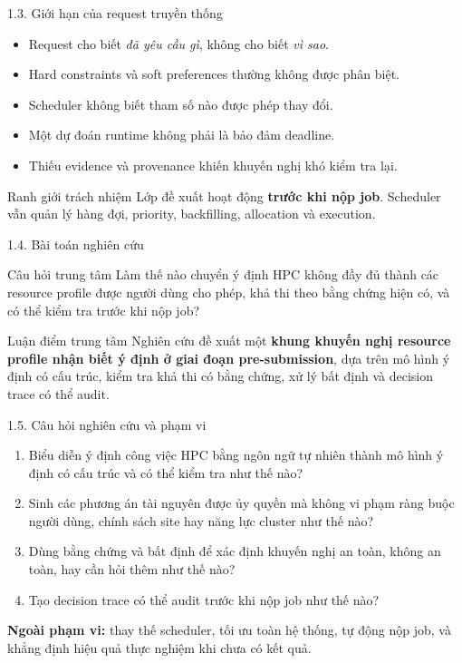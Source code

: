 \begin{frame}[t]{1.3. Giới hạn của request truyền thống}
\small
\begin{itemize}
  \item Request cho biết \emph{đã yêu cầu gì}, không cho biết \emph{vì sao}.
  \item Hard constraints và soft preferences thường không được phân biệt.
  \item Scheduler không biết tham số nào được phép thay đổi.
  \item Một dự đoán runtime không phải là bảo đảm deadline.
  \item Thiếu evidence và provenance khiến khuyến nghị khó kiểm tra lại.
\end{itemize}
\begin{exampleblock}{Ranh giới trách nhiệm}
Lớp đề xuất hoạt động \textbf{trước khi nộp job}. Scheduler vẫn quản lý hàng đợi, priority, backfilling, allocation và execution.
\end{exampleblock}
\end{frame}

\begin{frame}[t]{1.4. Bài toán nghiên cứu}
\small
\begin{block}{Câu hỏi trung tâm}
Làm thế nào chuyển ý định HPC không đầy đủ thành các resource profile được người dùng cho phép, khả thi theo bằng chứng hiện có, và có thể kiểm tra trước khi nộp job?
\end{block}
\begin{block}{Luận điểm trung tâm}
Nghiên cứu đề xuất một \textbf{khung khuyến nghị resource profile nhận biết ý định ở giai đoạn pre-submission}, dựa trên mô hình ý định có cấu trúc, kiểm tra khả thi có bằng chứng, xử lý bất định và decision trace có thể audit.
\end{block}
\end{frame}

\begin{frame}[t,shrink=8]{1.5. Câu hỏi nghiên cứu và phạm vi}
\small
\begin{enumerate}
  \item[\textbf{RQ1.}] Biểu diễn ý định công việc HPC bằng ngôn ngữ tự nhiên thành mô hình ý định có cấu trúc và có thể kiểm tra như thế nào?
  \item[\textbf{RQ2.}] Sinh các phương án tài nguyên được ủy quyền mà không vi phạm ràng buộc người dùng, chính sách site hay năng lực cluster như thế nào?
  \item[\textbf{RQ3.}] Dùng bằng chứng và bất định để xác định khuyến nghị an toàn, không an toàn, hay cần hỏi thêm như thế nào?
  \item[\textbf{RQ4.}] Tạo decision trace có thể audit trước khi nộp job như thế nào?
\end{enumerate}
\vspace{0.1cm}
\textbf{Ngoài phạm vi:} thay thế scheduler, tối ưu toàn hệ thống, tự động nộp job, và khẳng định hiệu quả thực nghiệm khi chưa có kết quả.
\end{frame}

